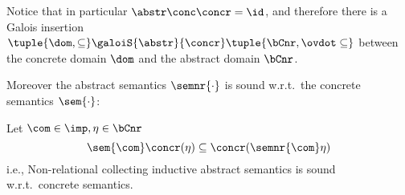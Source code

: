 Notice that in particular \(\abstr\conc\concr = \id\), and therefore
there is a Galois insertion
\(\tuple{\dom, \subseteq} \galoiS{\abstr}{\concr}\tuple{\bCnr,
  \ovdot\subseteq}\) between the concrete domain \(\dom\) and the
abstract domain \(\bCnr\).

Moreover the abstract semantics \(\semnr{\cdot}\) is sound w.r.t.\ the
concrete semantics \(\sem{\cdot}\):

\begin{lemma}\label{le:nrsoundness}
  Let \(\com\in\imp, \eta\in \bCnr\)
  \begin{equation*}
    \sem{\com}\concr(\eta) \subseteq \concr(\semnr{\com}\eta)
  \end{equation*}
  i.e., Non-relational collecting inductive abstract semantics is sound
  w.r.t.\ concrete semantics.
\end{lemma}

